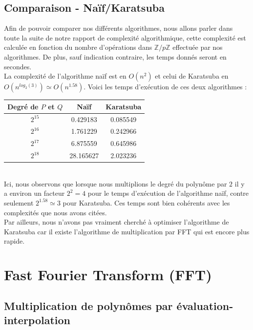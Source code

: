 \documentclass[12pt, a4paper]{article}
\begin{document}
\subsection{Comparaison - Naïf/Karatsuba}
Afin de pouvoir comparer nos différents algorithmes, nous allons parler dans toute la suite de notre rapport de complexité algorithmique, cette complexité est calculée en fonction du nombre d'opérations dans $\mathbb{Z}/p\mathbb{Z}$ effectuée par nos algorithmes. De plus, sauf indication contraire, les temps donnés seront en secondes.\\
\indent La complexité de l'algorithme naïf est en $O(n^2)$ et celui de Karatsuba en ${O(n^{log_2(3)}) \simeq O(n^{1.58})}$. Voici les temps d'exécution de ces deux algorithmes :
\begin{center}
\begin{tabular}{||c c c||}
\hline
Degré de $P$ et $Q$ & Naïf & Karatsuba \\
\hline\hline
$2^{15}$ & 0.429183 & 0.085549 \\
\hline
$2^{16}$ & 1.761229 & 0.242966 \\
\hline
$2^{17}$ & 6.875559 & 0.645986 \\
\hline
$2^{18}$ & 28.165627 & 2.023236 \\
\hline
\end{tabular}
\end{center}
{}
\ \\
\indent Ici, nous observons que lorsque nous multiplions le degré du polynôme par $2$ il y a environ un facteur $2^2 = 4$ pour le temps d'exécution de l'algorithme naïf, contre seulement $2^{1.58} \simeq 3$ pour Karatsuba. Ces temps sont bien cohérents avec les complexités que nous avons citées. \\
\indent Par ailleurs, nous n'avons pas vraiment cherché à optimiser l'algorithme de Karatsuba car il existe l'algorithme de multiplication par FFT qui est encore plus rapide.

\newpage

\section{Fast Fourier Transform (FFT)}

\subsection{Multiplication de polynômes par évaluation-interpolation}
\end{document}
